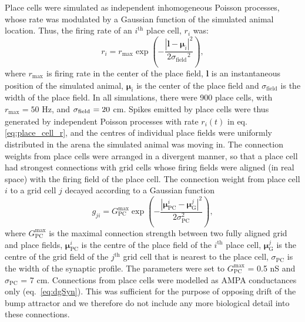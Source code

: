 \documentclass[a4paper,12pt]{article}
\newcommand{\ssc}[3]{\ensuremath{#1_{\text{#2}_{\text{#3}}}}}
\newcommand{\sigmasub}[1]{\ssc{\sigma}{\scriptsize{#1}}{}}
\begin{document}
Place cells were simulated as independent inhomogeneous Poisson processes,
whose rate was modulated by a Gaussian function of the simulated animal
location. Thus, the firing rate of an $i^{\text{th}}$ place cell, $r_i$ was:
\begin{equation}
    r_i = \ssc{r}{max}{} \exp\left(- \frac{|\mathbf{l} - \bm{\mu}_i|^2}{2
            \ssc{\sigma}{field}{}^2} \right),
    \label{eq:place_cell_r}
\end{equation}
where $\ssc{r}{max}{}$ is firing rate in the center of the place field,
$\mathbf{l}$ is an instantaneous position of the simulated animal,
$\bm{\mu}_i$ is the center of the place field and
$\ssc{\sigma}{field}{}$ is the width of the place field.
In all simulations,
there were 900 place cells, with $\ssc{r}{max}{} = 50$ Hz, and $\sigmasub{field}
= 20$ cm.  Spikes emitted by place cells were thus generated by independent
Poisson processes with rate $r_i(t)$ in eq. \eqref{eq:place_cell_r}, and the
centres of individual place fields were uniformly distributed in the arena the
simulated animal was moving in.
The connection weights from place cells were arranged in a divergent
manner, so that a place cell had strongest connections with grid cells whose
firing fields were aligned (in real space) with the firing field of the place
cell. The connection weight from place
cell $i$ to a grid cell $j$ decayed according to a Gaussian function
\begin{equation}
    g_{ji} = G_{\text{PC}}^{\text{max}} \exp\left(- \frac{|\bm{\mu}_{\text{PC}}^{i} -
    \bm{\mu}_{\text{G}}^j|^2}{2\sigma_\text{PC}^2} \right),
    \label{eq:TG_pc_diverg_conn}
\end{equation}
where $G_{\text{PC}}^{\text{max}}$ is the maximal connection strength between
two fully aligned grid and place fields, $\bm{\mu}_{\text{PC}}^{i}$ is the
centre of the place field of the $i^{\text{th}}$ place cell,
$\bm{\mu}_{\text{G}}^j$ is the centre of the grid field of the $j^{\text{th}}$
grid cell that is nearest to the place cell, $\sigma_\text{PC}$ is the width of
the synaptic profile. The parameters were set to $G_{\text{PC}}^{\text{max}}$ =
0.5 nS and $\sigma_\text{PC}$ = 7 cm. Connections from place cells were modelled
as AMPA conductances only (eq.~\ref{eq:dgSyn}). This was sufficient for the
purpose of opposing drift of the bump attractor and we therefore do not include
any more biological detail into these connections.
\end{document}
